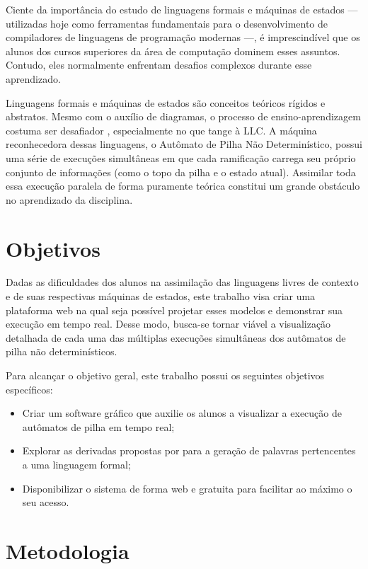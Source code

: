 Ciente da importância do estudo de linguagens formais e máquinas de estados — utilizadas hoje como ferramentas fundamentais para o desenvolvimento de compiladores de linguagens de programação modernas —, é imprescindível que os alunos dos cursos superiores da área de computação dominem esses assuntos. Contudo, eles normalmente enfrentam desafios complexos durante esse aprendizado.

Linguagens formais e máquinas de estados são conceitos teóricos rígidos e abstratos. Mesmo com o auxílio de diagramas, o processo de ensino-aprendizagem costuma ser desafiador \cite{Nelishia2010}, especialmente no que tange à \ac{LLC}. A máquina reconhecedora dessas linguagens, o Autômato de Pilha Não Determinístico, possui uma série de execuções simultâneas em que cada ramificação carrega seu próprio conjunto de informações (como o topo da pilha e o estado atual). Assimilar toda essa execução paralela de forma puramente teórica constitui um grande obstáculo no aprendizado da disciplina.

\section{Objetivos}
\label{sec:objetivos}

Dadas as dificuldades dos alunos na assimilação das linguagens livres de contexto e de suas respectivas máquinas de estados, este trabalho visa criar uma plataforma web na qual seja possível projetar esses modelos e demonstrar sua execução em tempo real. Desse modo, busca-se tornar viável a visualização detalhada de cada uma das múltiplas execuções simultâneas dos autômatos de pilha não determinísticos.

Para alcançar o objetivo geral, este trabalho possui os seguintes objetivos específicos:

\begin{itemize}
    \item Criar um software gráfico que auxilie os alunos a visualizar a execução de autômatos de pilha em tempo real;
    \item Explorar as derivadas propostas por \cite{Brzozowski64} para a geração de palavras pertencentes a uma linguagem formal;
    \item Disponibilizar o sistema de forma web e gratuita para facilitar ao máximo o seu acesso. 
\end{itemize}

\section{Metodologia}
\label{sec:metodologia}

